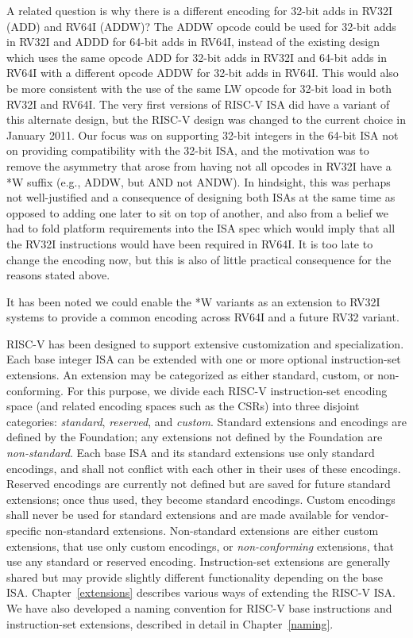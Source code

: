 \begin{commentary}
A related question is why there is a different encoding for 32-bit
adds in RV32I (ADD) and RV64I (ADDW)? The ADDW opcode could be used
for 32-bit adds in RV32I and ADDD for 64-bit adds in RV64I, instead of
the existing design which uses the same opcode ADD for 32-bit adds in
RV32I and 64-bit adds in RV64I with a different opcode ADDW for 32-bit
adds in RV64I.  This would also be more consistent with the use of the
same LW opcode for 32-bit load in both RV32I and RV64I.  The very
first versions of RISC-V ISA did have a variant of this alternate
design, but the RISC-V design was changed to the current choice in
January 2011.  Our focus was on supporting 32-bit integers in the
64-bit ISA not on providing compatibility with the 32-bit ISA, and the
motivation was to remove the asymmetry that arose from having not all
opcodes in RV32I have a *W suffix (e.g., ADDW, but AND not ANDW).  In
hindsight, this was perhaps not well-justified and a consequence of
designing both ISAs at the same time as opposed to adding one later to
sit on top of another, and also from a belief we had to fold platform
requirements into the ISA spec which would imply that all the RV32I
instructions would have been required in RV64I.  It is too late to
change the encoding now, but this is also of little practical
consequence for the reasons stated above.

It has been noted we could enable the *W variants as an extension to
RV32I systems to provide a common encoding across RV64I and a future
RV32 variant.
\end{commentary}

RISC-V has been designed to support extensive customization and
specialization.  Each base integer ISA can be extended with one or
more optional instruction-set extensions.  An extension may be
categorized as either standard, custom, or non-conforming.
For this purpose, we divide each RISC-V
instruction-set encoding space (and related encoding spaces such as
the CSRs) into three disjoint categories: {\em standard}, {\em
  reserved}, and {\em custom}.  Standard extensions and encodings
are defined by the Foundation; any extensions not defined by the
Foundation are {\em non-standard}.
Each base ISA and its standard extensions use only standard encodings,
and shall not conflict with each other in their uses of these encodings.
Reserved encodings are currently not defined but are saved for future
standard extensions; once thus used, they become standard encodings.
Custom encodings shall never be used for standard extensions and are
made available for vendor-specific non-standard extensions.
Non-standard extensions are either custom extensions, that use only
custom encodings, or {\em non-conforming} extensions, that use any
standard or reserved encoding.
Instruction-set extensions are generally shared but may provide slightly different
functionality depending on the base ISA.  Chapter~\ref{extensions}
describes various ways of extending the RISC-V ISA.  We have also
developed a naming convention for RISC-V base instructions and
instruction-set extensions, described in detail in
Chapter~\ref{naming}.

